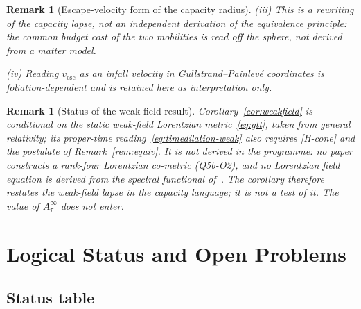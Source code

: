 \documentclass[11pt,a4paper]{article}
\newtheorem{remark}[theorem]{Remark}
\begin{document}
\begin{remark}[Escape-velocity form of the capacity radius]
      \noindent
      (iii) This is a rewriting of the capacity lapse, not an independent derivation of the equivalence
      principle: the common budget cost of the two mobilities is read off the sphere, not derived from
      a matter model.

      \noindent
      (iv) Reading $v_{\mathrm{esc}}$ as an infall velocity in Gullstrand--Painlev\'e coordinates is
      foliation-dependent and is retained here as interpretation only.
    \end{remark}

    \begin{remark}[Status of the weak-field result]\label{rem:status-weak}
      Corollary~\ref{cor:weakfield} is conditional on the static weak-field Lorentzian metric~\eqref{eq:gtt},
      taken from general relativity; its proper-time reading~\eqref{eq:timedilation-weak} also requires [H-cone]
      and the postulate of Remark~\ref{rem:equiv}.
      It is not derived in the programme: no paper constructs a rank-four Lorentzian co-metric (Q5b-O2), and no
      Lorentzian field equation is derived from the spectral functional of~\cite{Beau2026h}.
      The corollary therefore restates the weak-field lapse in the capacity language; it is not a test of it.
      The value of $A_\tau^\infty$ does not enter.
    \end{remark}

  \section{Logical Status and Open Problems}\label{sec:status}

  \subsection{Status table}
\end{document}
